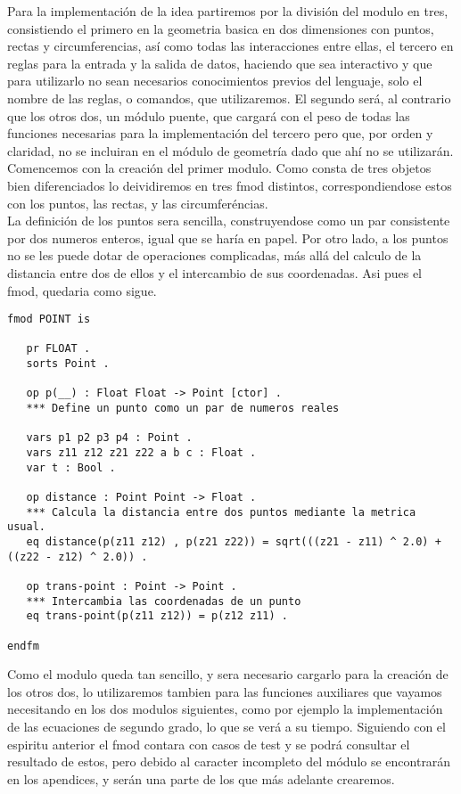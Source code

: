 \documentclass[12pt,a4paper]{book}
\begin{document}
Para la implementaci\'on de la idea partiremos por la división del modulo en tres, consistiendo el primero en la geometria basica en dos dimensiones con puntos, rectas y circumferencias, as\'i como todas las interacciones entre ellas, el tercero en reglas para la entrada y la salida de datos, haciendo que sea interactivo y que para utilizarlo no sean necesarios conocimientos previos del lenguaje, solo el nombre de las reglas, o comandos, que utilizaremos. El segundo ser\'a, al contrario que los otros dos, un m\'odulo puente, que cargar\'a con el peso de todas las funciones necesarias para la implementaci\'on del tercero pero que, por orden y claridad, no se incluiran en el m\'odulo de geometr\'ia dado que ah\'i no se utilizar\'an. \\

Comencemos con la creaci\'on del primer modulo.  Como consta de tres objetos bien diferenciados lo deividiremos en tres fmod distintos, correspondiendose estos con los puntos, las rectas, y las circumfer\'encias. \\

La definici\'on de los puntos sera sencilla, construyendose como un par consistente por dos numeros enteros, igual que se har\'ia en papel. Por otro lado, a los puntos no se les puede dotar de operaciones complicadas, m\'as all\'a del calculo de la distancia entre dos de ellos y el intercambio de sus coordenadas. Asi pues el fmod, quedaria como sigue.

\begin{verbatim}
fmod POINT is

   pr FLOAT .
   sorts Point .

   op p(__) : Float Float -> Point [ctor] .
   *** Define un punto como un par de numeros reales

   vars p1 p2 p3 p4 : Point .
   vars z11 z12 z21 z22 a b c : Float .
   var t : Bool .

   op distance : Point Point -> Float .
   *** Calcula la distancia entre dos puntos mediante la metrica usual.
   eq distance(p(z11 z12) , p(z21 z22)) = sqrt(((z21 - z11) ^ 2.0) + ((z22 - z12) ^ 2.0)) .

   op trans-point : Point -> Point .
   *** Intercambia las coordenadas de un punto
   eq trans-point(p(z11 z12)) = p(z12 z11) .

endfm
\end{verbatim}

Como el modulo queda tan sencillo, y sera necesario cargarlo para la creación de los otros dos, lo utilizaremos tambien para las funciones auxiliares que vayamos necesitando en los dos modulos siguientes, como por ejemplo la implementaci\'on de las ecuaciones de segundo grado, lo que se ver\'a a su tiempo. Siguiendo con el espiritu anterior el fmod contara con casos de test y se podr\'a consultar el resultado de estos, pero debido al caracter incompleto del m\'odulo se encontrar\'an en los apendices, y ser\'an una parte de los que m\'as adelante crearemos. \\
\end{document}
